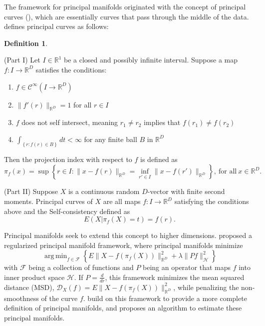 \documentclass[11pt,reqno]{article}
\DeclareMathOperator*{\argmin}{arg\,min}
\theoremstyle{definition}
\newtheorem{definition}{Definition}
\begin{document}
The framework for principal manifolds originated with the concept of principal curves (\cite{hastiePrincipalCurves1989}), which are essentially curves that pass through the middle of the data. \cite{hastiePrincipalCurves1989} defines principal curves as follows:

\begin{definition}
  \label{def:principal_curves}

  (Part I) Let $I \in \mathbb{R}^{1}$ be a closed and possibly infinite interval. Suppose a map $f:I \to \mathbb{R}^{D}$ satisfies the conditions:
  \begin{enumerate}
    \label{enum:hs_conditions}
  
    \item $f \in \mathcal{C}^{\infty}(I \to \mathbb{R}^{D})$
    \item $\|f'(r)\|_{\mathbb{R}^{D}} = 1$ for all $r \in I$
    \item $f$ does not self intersect, meaning $r_1 \neq r_2$ implies that $f(r_1) \neq f(r_2)$
    \item $\int_{\left\{r: f(r) \in B\right\}}dt < \infty$ for any finite ball $B$ in $\mathbb{R}^{D}$
  \end{enumerate}
  Then the projection index with respect to $f$ is defined as \[%
    \pi_f(x) = \sup\left\{r \in I: \|x - f(r)\|_{\mathbb{R}^{D}} = \inf_{r' \in I}\|x - f(r')\|_{\mathbb{R}^{D}} \right\}, \ \text{for all} \ x \in \mathbb{R}^{D}
  .\]%

  (Part II) Suppose $X$ is a continuous random $D$-vector with finite second moments. Principal curves of $X$ are all maps $f: I \to \mathbb{R}^{D}$ satisfying the conditions above and the Self-consistency defined as \[%
    E(X | \pi_f(X) = t) = f(r)
  .\]%
\end{definition}

Principal manifolds seek to extend this concept to higher dimensions. \cite{smolaRegularizedPrincipalManifolds2001} proposed a regularized principal manifold framework, where principal manifolds minimize \[%
  \argmin_{f \in \mathcal{F}}\left\{E\|X - f\left(\pi_f(X)\right)\|_{\mathbb{R}^D}^2 + \lambda\|Pf\|_{\mathcal{H}}^2\right\}
\]%
with $\mathcal{F}$ being a collection of functions and $P$ being an operator that maps $f$ into inner product space $\mathcal{H}$. If $P = \frac{d}{dr}$, this framework minimizes the mean squared distance (MSD), $\mathcal{D}_X(f) = E\|X - f(\pi_f(X))\|_{\mathbb{R}^{D}}^2$, while penalizing the non-smoothness of the curve $f$. \cite{mengPrincipalManifoldEstimation2021} build on this framework to provide a more complete definition of principal manifolds, and proposes an algorithm to estimate these principal manifolds.
\end{document}
